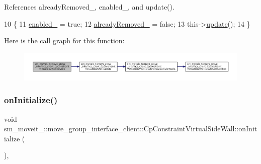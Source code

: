 References already\+Removed\+\_\+, enabled\+\_\+, and update().


\begin{DoxyCode}
10         \{
11             \hyperlink{classsm__moveit__4_1_1move__group__interface__client_1_1CpConstraintVirtualSideWall_a14d8cbbcc4b6f3fa158959b1eb1adc0f}{enabled\_} = \textcolor{keyword}{true};
12             \hyperlink{classsm__moveit__4_1_1move__group__interface__client_1_1CpConstraintVirtualSideWall_a5b11a3fcd2ead0a3ea7fe94fdec3747c}{alreadyRemoved\_} = \textcolor{keyword}{false};
13             this->\hyperlink{classsm__moveit__4_1_1move__group__interface__client_1_1CpConstraintVirtualSideWall_a3a2636a6652706bc81721c0ce2d90643}{update}();
14         \}
\end{DoxyCode}
Here is the call graph for this function\+:
\nopagebreak
\begin{figure}[H]
\begin{center}
\leavevmode
\includegraphics[width=350pt]{classsm__moveit__4_1_1move__group__interface__client_1_1CpConstraintVirtualSideWall_a9a74d952f6ce519e327305cf06f69daa_cgraph}
\end{center}
\end{figure}
\mbox{\label{classsm__moveit__4_1_1move__group__interface__client_1_1CpConstraintVirtualSideWall_aa64ed2e50808871372b2ef76cbac8bbc}} 
\subsubsection{\texorpdfstring{on\+Initialize()}{onInitialize()}}
{\footnotesize\ttfamily void sm\+\_\+moveit\+\_\+::move\+\_\+group\+\_\+interface\+\_\+client\+::\+Cp\+Constraint\+Virtual\+Side\+Wall\+::on\+Initialize (\begin{DoxyParamCaption}{ }\end{DoxyParamCaption})\hspace{0.3cm}{\ttfamily [override]}, {\ttfamily [virtual]}}



